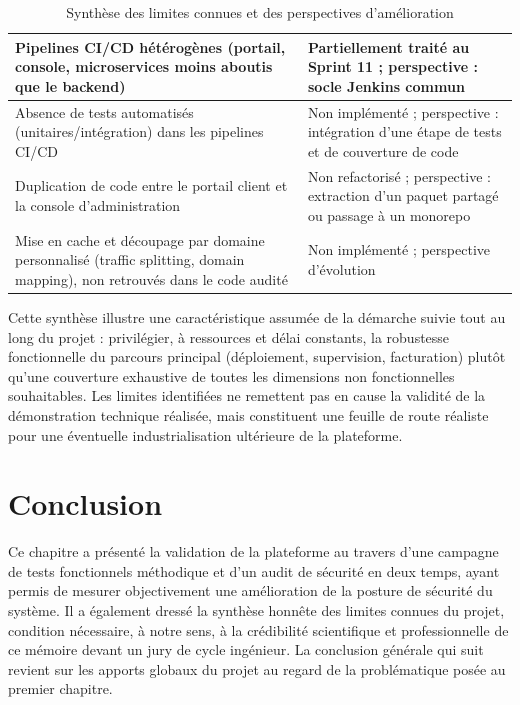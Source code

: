 \begin{table}[H]
\begin{tabular}{|p{6.5cm}|p{7.5cm}|}
\hline
Pipelines CI/CD hétérogènes (portail, console, microservices moins aboutis que le backend) & Partiellement traité au Sprint 11 ; perspective : socle Jenkins commun \\
\hline
Absence de tests automatisés (unitaires/intégration) dans les pipelines CI/CD & Non implémenté ; perspective : intégration d'une étape de tests et de couverture de code \\
\hline
Duplication de code entre le portail client et la console d'administration & Non refactorisé ; perspective : extraction d'un paquet partagé ou passage à un monorepo \\
\hline
Mise en cache et découpage par domaine personnalisé (traffic splitting, domain mapping), non retrouvés dans le code audité & Non implémenté ; perspective d'évolution \\
\hline
\end{tabular}
\caption{Synthèse des limites connues et des perspectives d'amélioration}
\label{tab:limites}
\end{table}

Cette synthèse illustre une caractéristique assumée de la démarche suivie tout au long du projet : privilégier, à ressources et délai constants, la robustesse fonctionnelle du parcours principal (déploiement, supervision, facturation) plutôt qu'une couverture exhaustive de toutes les dimensions non fonctionnelles souhaitables. Les limites identifiées ne remettent pas en cause la validité de la démonstration technique réalisée, mais constituent une feuille de route réaliste pour une éventuelle industrialisation ultérieure de la plateforme.

\section{Conclusion}

Ce chapitre a présenté la validation de la plateforme au travers d'une campagne de tests fonctionnels méthodique et d'un audit de sécurité en deux temps, ayant permis de mesurer objectivement une amélioration de la posture de sécurité du système. Il a également dressé la synthèse honnête des limites connues du projet, condition nécessaire, à notre sens, à la crédibilité scientifique et professionnelle de ce mémoire devant un jury de cycle ingénieur. La conclusion générale qui suit revient sur les apports globaux du projet au regard de la problématique posée au premier chapitre.
